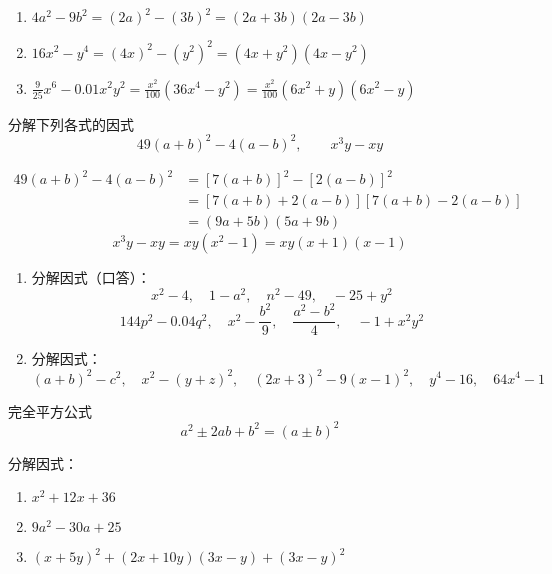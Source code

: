 \begin{solution}
\begin{enumerate}
    \item $4a^2-9b^2=(2a)^2-(3b)^2=(2a+3b)(2a-3b)$
    \item $16x^2-y^4=(4x)^2-(y^2)^2=(4x+y^2)(4x-y^2)$
    \item $\frac{9}{25}x^6-0.01 x^2y^2=\frac{x^2}{100}(36x^4-y^2)=\frac{x^2}{100}(6x^2+y)(6x^2-y)$
\end{enumerate}    
\end{solution}

\begin{example}
分解下列各式的因式
\[49(a+b)^2-4(a-b)^2,\qquad x^3y-xy\]
\end{example}

\begin{solution}
\[\begin{split}
    49(a+b)^2-4(a-b)^2&=[7(a+b)]^2-[2(a-b)]^2\\
    &=[7(a+b)+2(a-b)][7(a+b)-2(a-b)]\\
    &=(9a+5b)(5a+9b)
\end{split}\]
\[x^3y-xy=xy(x^2-1)=xy(x+1)(x-1)\]    
\end{solution}

\begin{ex}
\begin{enumerate}
    \item 分解因式（口答）：
    \[x^2-4,\quad 1-a^2,\quad n^2-49,\quad -25+y^2 \]
    \[144p^2-0.04q^2,\quad x^2-\frac{b^2}{9},\quad \frac{a^2-b^2}{4},\quad -1+x^2y^2\]
    \item 分解因式：
    \[(a+b)^2-c^2,\quad x^2-(y+z)^2,\quad (2x+3)^2-9(x-1)^2,\quad y^4-16,\quad 64x^4-1 \]
\end{enumerate}
\end{ex}

\begin{blk}{完全平方公式}
    \[a^2\pm 2ab+b^2=(a\pm b)^2\]
\end{blk}

\begin{example}
分解因式：
\begin{enumerate}
    \item $x^2+12x+36$
    \item $9a^2-30a+25$
    \item $(x+5y)^2+(2x+10y)(3x-y)+(3x-y)^2$
\end{enumerate}
\end{example}

